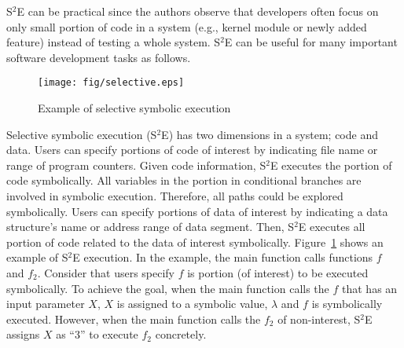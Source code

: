 S$^2$E can be practical since the authors observe that developers often focus on only small portion of code in a system (e.g., kernel module or newly added feature) instead of testing a whole system. S$^2$E can be useful for many important software development tasks as follows.

\begin{figure}
\centering
\texttt{[image: fig/selective.eps]} 
\caption{\label{fig:s2e}Example of selective symbolic execution} 
\end{figure}


Selective symbolic execution (S$^2$E) has two dimensions in a system; code and data. Users can specify portions of code of interest by indicating file name or range of program counters. Given code information, S$^2$E executes the portion of code symbolically. All variables in the portion in conditional branches are involved in symbolic execution. Therefore, all paths could be explored symbolically. Users can specify portions of data of interest by indicating a data structure's name or address range of data segment. Then, S$^2$E executes all portion of code related to the data of interest symbolically.
Figure~\ref{fig:s2e} shows an example of S$^2$E execution. In the example, the main function calls functions $f$ and $f_2$. Consider that users specify $f$ is portion (of interest) to be executed symbolically. To achieve the goal, when the main function calls the $f$ that has an input parameter $X$, $X$ is assigned to a symbolic value, $\lambda$ and $f$ is symbolically executed. However, when the main function calls the $f_2$ of non-interest, S$^2$E assigns $X$ as ``3'' to execute $f_2$ concretely.


